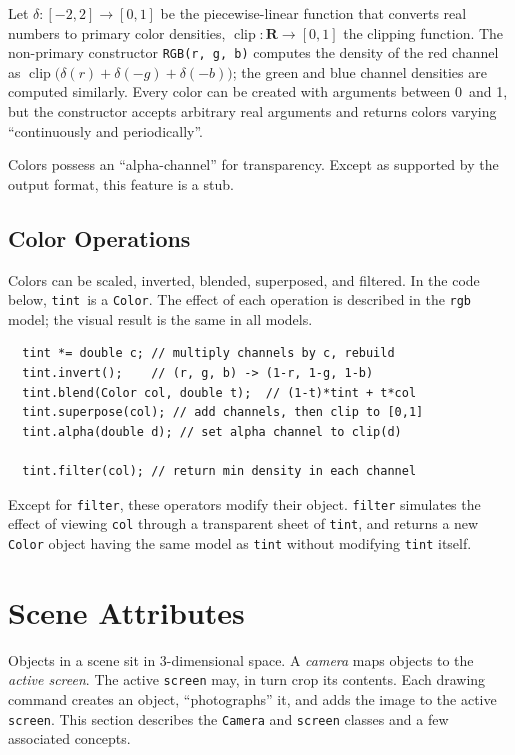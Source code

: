 \documentclass[12pt,letterpaper]{book}
\newcommand{\code}[1]{\texttt{#1}}
\DeclareMathOperator{\clip}{clip}
\newcommand{\teximath}[1]{$#1$}
\newcommand{\findex}[1]{\ignorespaces}
\begin{document}
Let \teximath{\delta:[-2,2]\to[0,1]} be the piecewise-linear function
that converts real numbers to primary color densities,
\teximath{\clip:\mathbf{R}\to[0,1]} the clipping function.  The
non-primary constructor \code{RGB(r, g, b)} computes the density of
the red channel as
\teximath{\clip\bigl(\delta(r)+\delta(-g)+\delta(-b)\bigr)}; the green
and blue channel densities are computed similarly. Every color can be
created with arguments between 0~and 1, but the constructor accepts
arbitrary real arguments and returns colors varying ``continuously and
periodically''.
%

Colors possess an ``alpha-channel'' for transparency. Except as
supported by the output format, this feature is a stub.


\subsection{Color Operations}

%
Colors can be scaled, inverted, blended, superposed, and filtered. In
the code below, \code{tint}~is a \code{Color}. The effect of each
operation is described in the \code{rgb} model; the visual result is
the same in all models.
\findex{Color.invert}
\findex{Color.blend}
\findex{Color.superpose}
\findex{Color.alpha}
\findex{Color.filter}
\begin{verbatim}
  tint *= double c; // multiply channels by c, rebuild
  tint.invert();    // (r, g, b) -> (1-r, 1-g, 1-b)
  tint.blend(Color col, double t);  // (1-t)*tint + t*col
  tint.superpose(col); // add channels, then clip to [0,1]
  tint.alpha(double d); // set alpha channel to clip(d)

  tint.filter(col); // return min density in each channel
\end{verbatim}
Except for \code{filter}, these operators modify their object. 
\code{filter} simulates the effect of viewing \code{col}
through a transparent sheet of \code{tint}, and returns a new
\code{Color} object having the same model as \code{tint} without
modifying \code{tint} itself.


\section{Scene Attributes}

Objects in a scene sit in 3-dimensional space. A \emph{camera}
maps objects to the \emph{active screen}. The active \code{screen}
may, in turn crop its contents. Each drawing command creates an
object, ``photographs'' it, and adds the image to the active
\code{screen}. This section describes the \code{Camera} and
\code{screen} classes and a few associated concepts.
\end{document}
